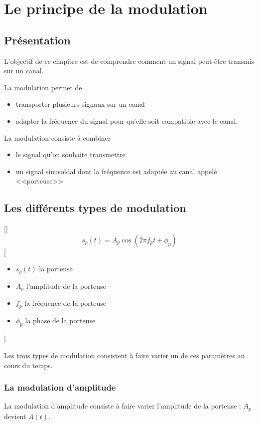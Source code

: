 \section{Le principe de la modulation}
\subsection{Présentation}
L'objectif de ce chapitre est de comprendre comment un signal peut-être transmis sur un canal.


La modulation permet de 
\begin{itemize}
  \item transporter plusieurs signaux sur un canal
  \item adapter la fréquence du signal pour qu'elle soit compatible avec le canal.
\end{itemize}

La modulation consiste à combiner 
\begin{itemize}
  \item le signal qu'on souhaite transmettre
  \item un signal sinusoïdal dont la fréquence est adaptée au canal appelé <<porteuse>>
\end{itemize}

\subsection{Les différents types de modulation}
[]
{$$s_p(t)=A_p\cos(2\pi f_pt+\phi_p)$$}
[
  \begin{itemize}
    \item $s_p(t)$ la porteuse
    \item $A_p$ l'amplitude de la porteuse
    \item $f_p$ la fréquence de la porteuse
    \item $\phi_p$ la phase de la porteuse
  \end{itemize}
]

Les trois types de modulation consistent à faire varier un de ces paramètres au cours du temps.

\subsubsection{La modulation d'amplitude}
La modulation d'amplitude consiste à faire varier l'amplitude de la porteuse : $A_p$ devient $A(t)$.

